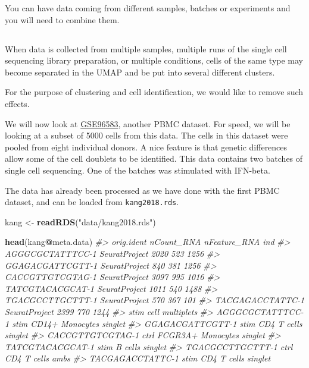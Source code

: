 \documentclass[
]{book}
\newenvironment{Shaded}{\begin{snugshade}}{\end{snugshade}}
\newcommand{\CommentTok}[1]{\textcolor[rgb]{0.56,0.35,0.01}{\textit{#1}}}
\newcommand{\FunctionTok}[1]{\textcolor[rgb]{0.13,0.29,0.53}{\textbf{#1}}}
\newcommand{\NormalTok}[1]{#1}
\newcommand{\OtherTok}[1]{\textcolor[rgb]{0.56,0.35,0.01}{#1}}
\newcommand{\SpecialCharTok}[1]{\textcolor[rgb]{0.81,0.36,0.00}{\textbf{#1}}}
\newcommand{\StringTok}[1]{\textcolor[rgb]{0.31,0.60,0.02}{#1}}
\begin{document}
You can have data coming from different samples, batches or experiments and you will need to combine them.

\hypertarget{section-13}{%
\subsection*{}\label{section-13}}

When data is collected from multiple samples, multiple runs of the single cell sequencing library preparation, or multiple conditions, cells of the same type may become separated in the UMAP and be put into several different clusters.

For the purpose of clustering and cell identification, we would like to remove such effects.

We will now look at \href{https://www.ncbi.nlm.nih.gov/geo/query/acc.cgi?acc=GSE96583}{GSE96583}, another PBMC dataset. For speed, we will be looking at a subset of 5000 cells from this data. The cells in this dataset were pooled from eight individual donors. A nice feature is that genetic differences allow some of the cell doublets to be identified. This data contains two batches of single cell sequencing. One of the batches was stimulated with IFN-beta.

The data has already been processed as we have done with the first PBMC dataset, and can be loaded from \texttt{kang2018.rds}.

\begin{Shaded}
\begin{Highlighting}[]
\NormalTok{kang }\OtherTok{\textless{}{-}} \FunctionTok{readRDS}\NormalTok{(}\StringTok{"data/kang2018.rds"}\NormalTok{)}

\FunctionTok{head}\NormalTok{(kang}\SpecialCharTok{@}\NormalTok{meta.data)}
\CommentTok{\#\textgreater{}                     orig.ident nCount\_RNA nFeature\_RNA  ind}
\CommentTok{\#\textgreater{} AGGGCGCTATTTCC{-}1 SeuratProject       2020          523 1256}
\CommentTok{\#\textgreater{} GGAGACGATTCGTT{-}1 SeuratProject        840          381 1256}
\CommentTok{\#\textgreater{} CACCGTTGTCGTAG{-}1 SeuratProject       3097          995 1016}
\CommentTok{\#\textgreater{} TATCGTACACGCAT{-}1 SeuratProject       1011          540 1488}
\CommentTok{\#\textgreater{} TGACGCCTTGCTTT{-}1 SeuratProject        570          367  101}
\CommentTok{\#\textgreater{} TACGAGACCTATTC{-}1 SeuratProject       2399          770 1244}
\CommentTok{\#\textgreater{}                  stim              cell multiplets}
\CommentTok{\#\textgreater{} AGGGCGCTATTTCC{-}1 stim   CD14+ Monocytes    singlet}
\CommentTok{\#\textgreater{} GGAGACGATTCGTT{-}1 stim       CD4 T cells    singlet}
\CommentTok{\#\textgreater{} CACCGTTGTCGTAG{-}1 ctrl FCGR3A+ Monocytes    singlet}
\CommentTok{\#\textgreater{} TATCGTACACGCAT{-}1 stim           B cells    singlet}
\CommentTok{\#\textgreater{} TGACGCCTTGCTTT{-}1 ctrl       CD4 T cells       ambs}
\CommentTok{\#\textgreater{} TACGAGACCTATTC{-}1 stim       CD4 T cells    singlet}
\end{Highlighting}
\end{Shaded}
\end{document}
